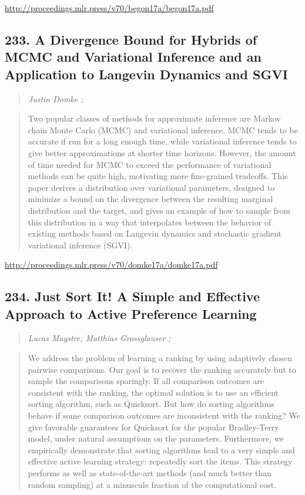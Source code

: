 \documentclass{article}
\begin{document}
\href{http://proceedings.mlr.press/v70/begon17a/begon17a.pdf}{http://proceedings.mlr.press/v70/begon17a/begon17a.pdf}

\subsection{233. A Divergence Bound for Hybrids of MCMC and Variational Inference and an Application to Langevin Dynamics and SGVI}

\begin{quote}
\footnotesize{\textit{Justin Domke ;}}

\end{quote}

\begin{quote}
    Two popular classes of methods for approximate inference are Markov chain Monte Carlo (MCMC) and variational inference. MCMC tends to be accurate if run for a long enough time, while variational inference tends to give better approximations at shorter time horizons. However, the amount of time needed for MCMC to exceed the performance of variational methods can be quite high, motivating more fine-grained tradeoffs. This paper derives a distribution over variational parameters, designed to minimize a bound on the divergence between the resulting marginal distribution and the target, and gives an example of how to sample from this distribution in a way that interpolates between the behavior of existing methods based on Langevin dynamics and stochastic gradient variational inference (SGVI).  
\end{quote}

\href{http://proceedings.mlr.press/v70/domke17a/domke17a.pdf}{http://proceedings.mlr.press/v70/domke17a/domke17a.pdf}

\subsection{234. Just Sort It! A Simple and Effective Approach to Active Preference Learning}

\begin{quote}
\footnotesize{\textit{Lucas Maystre, Matthias Grossglauser ;}}

\end{quote}

\begin{quote}
    We address the problem of learning a ranking by using adaptively chosen pairwise comparisons. Our goal is to recover the ranking accurately but to sample the comparisons sparingly. If all comparison outcomes are consistent with the ranking, the optimal solution is to use an efficient sorting algorithm, such as Quicksort. But how do sorting algorithms behave if some comparison outcomes are inconsistent with the ranking? We give favorable guarantees for Quicksort for the popular Bradley-Terry model, under natural assumptions on the parameters. Furthermore, we empirically demonstrate that sorting algorithms lead to a very simple and effective active learning strategy: repeatedly sort the items. This strategy performs as well as state-of-the-art methods (and much better than random sampling) at a minuscule fraction of the computational cost.  
\end{quote}
\end{document}
